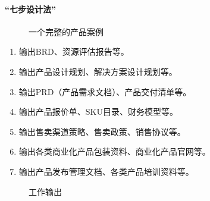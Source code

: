 \documentclass[letterpaper,10pt,english]{sphinxmanual}
\begin{document}
\paragraph{“七步设计法”}
\label{\detokenize{chapter_knowledge/steps:id3}}
\begin{figure}[H]
\centering
\capstart

\noindent{}
\caption{一个完整的产品案例\sphinxfootnotemark[477]}\label{\detokenize{chapter_knowledge/steps:id6}}\end{figure}
%
\begin{footnotetext}[477]\sphinxAtStartFootnote
{}
%
\end{footnotetext}\ignorespaces \begin{enumerate}
%
\item {} 
输出BRD、资源评估报告等。

\item {} 
输出产品设计规划、解决方案设计规划等。

\item {} 
输出PRD（产品需求文档）、产品交付清单等。

\item {} 
输出产品报价单、SKU目录、财务模型等。

\item {} 
输出售卖渠道策略、售卖政策、销售协议等。

\item {} 
输出各类商业化产品包装资料、商业化产品官网等。

\item {} 
输出产品发布管理文档、各类产品培训资料等。

\end{enumerate}

\begin{figure}[H]
\centering
\capstart

\noindent{}
\caption{工作输出\sphinxfootnotemark[478]}\label{\detokenize{chapter_knowledge/steps:id7}}\end{figure}
%
\begin{footnotetext}[478]\sphinxAtStartFootnote
{}
%
\end{footnotetext}\ignorespaces 
\end{document}
